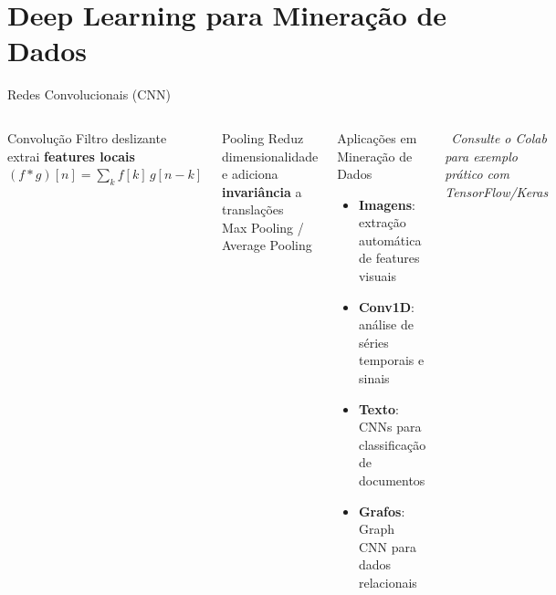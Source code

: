 \documentclass[aspectratio=169]{beamer}
\begin{document}
\section{Deep Learning para Mineração de Dados}

\begin{frame}{Redes Convolucionais (CNN)}
    \begin{columns}
        \begin{block}{Convolução}
            Filtro deslizante extrai \textbf{features locais}\\
            $(f * g)[n] = \sum_{k} f[k]\, g[n-k]$
        \end{block}
        \begin{block}{Pooling}
            Reduz dimensionalidade e adiciona \textbf{invariância} a translações\\
            Max Pooling / Average Pooling
        \end{block}
        \begin{block}{Aplicações em Mineração de Dados}
            \begin{itemize}
                \item \textbf{Imagens}: extração automática de features visuais
                \item \textbf{Conv1D}: análise de séries temporais e sinais
                \item \textbf{Texto}: CNNs para classificação de documentos
                \item \textbf{Grafos}: Graph CNN para dados relacionais
            \end{itemize}
        \end{block}
        \vspace{0.2cm}
        \centering\tiny \textit{\faArrowRight\ Consulte o Colab para exemplo prático com TensorFlow/Keras}
    \end{columns}
\end{frame}
\end{document}
